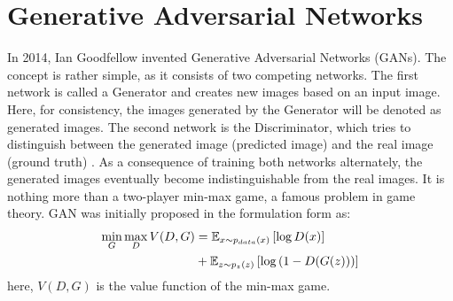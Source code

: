 \section{Generative Adversarial Networks}
In 2014, Ian Goodfellow invented Generative Adversarial Networks (GANs). The concept is rather simple, as it consists of two competing networks. The first network is called a Generator and creates new images based on an input image. Here, for consistency, the images generated by the Generator will be denoted as generated images. The second network is the Discriminator, which tries to distinguish between the generated image (predicted image) and the real image (ground truth) \cite{goodfellow2014generative}.
As a consequence of training both networks alternately, the generated images eventually become indistinguishable from the real images. It is nothing more than a two-player min-max game, a famous problem in game theory. GAN was initially proposed in the formulation form as:
\begin{equation}
	\centering
	\begin{aligned}
		\min_{G} \max_{D} V(D, G) &= \mathbb{E}_{x \sim p_{data}(x)} \left[ \log D(x) \right] \\
		&+ \mathbb{E}_{z \sim p_{z}(z)} \left[ \log \left( 1-D(G(z)) \right) \right]
	\end{aligned}
	\label{eq:Basic_GAN}
\end{equation}
here, $V(D, G)$ is the value function of the min-max game. 

